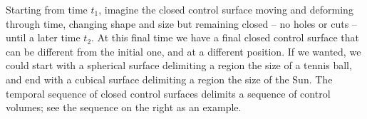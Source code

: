 \documentclass[a4paper,12pt,%
onecolumn,oneside,titlepage,%
british%
]{memoir}
\renewcommand*{\|}[1][]{\nonscript\:#1\vert\nonscript\:\mathopen{}}
\begin{document}
Starting from time $t_{1}$, imagine the closed control surface moving and deforming through time, changing shape and size but remaining closed -- no holes or cuts -- until a later time $t_{2}$. At this final time we have a final closed control surface that can be different from the initial one, and at a different position. If we wanted, we could start with a spherical surface delimiting a region the size of a tennis ball, and end with a cubical surface delimiting a region the size of the Sun. The temporal sequence of closed control surfaces delimits a sequence of control volumes; see the sequence on the right as an example.
\end{document}
